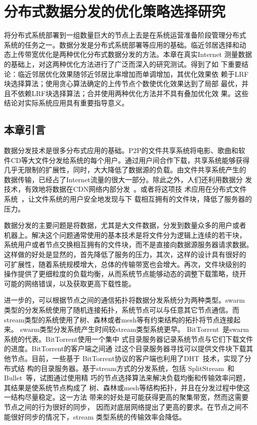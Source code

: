 \chapter{分布式数据分发的优化策略选择研究}
\label{chap:bt}

将分布式系统部署到一组数量巨大的节点上去是在系统运营准备阶段管理分布式
系统的任务之一。数据分发是分布式系统部署等应用的基础。临近邻居选择和动
态上传带宽优化是两种优化分布式数据分发的方法。本章在真实Internet
测量数据的基础上，对这两种优化方法进行了广泛而深入的研究测试。得到了如
下重要结论：临近邻居优化效果随邻近邻居比率增加而单调增加，其优化效果依
赖于LRF块选择算法；使用贪心算法确定的上传节点个数使优化效果达到了局部
最优，并且不依赖LRF块选择算法；合并使用两种优化方法并不具有叠加优化效
果。这些结论对实际系统应用具有重要指导意义。

\section{本章引言}


数据分发技术是很多分布式应用的基础。P2P的文件共享系统将电影、歌曲和软
件CD等大文件分发给系统的每个用户。通过用户间合作下载，共享系统能够获得
几乎无限制的扩展性，同时，大大降低了数据源的负载。由文件共享系统产生的
数据传输，已经占了Internet流量的很大一部分。除此之外，人们还利用数据分
发技术，有效地将数据在CDN网络内部分发~\cite{fastreplica}。或者将这项技
术应用在分布式文件系统~\cite{sharkfs}，让文件系统的用户安全地发现与下
载相互拥有的文件块，降低了服务器的压力。

数据分发的主要问题是将数据，尤其是大文件数据，分发到数量众多的用户或者
机器上。解决这个问题通常使用的基本技术是将文件分为逻辑上连续的若干块，
系统用户或者节点交换相互拥有的文件块，而不是直接向数据源服务器请求数据。
这样做的好处是显然的，首先降低了服务的压力，其次，这样的设计具有很好的
可扩展性，随着系统规模增大，总体的传输带宽也会增大。再次，文件块级别的
操作提供了更细粒度的负载均衡，从而系统节点能够动态的调整下载策略，绕开
可能的网络错误，以及获取更高下载性能。

进一步的，可以根据节点之间的通信拓扑将数据分发系统分为两种类型。swarm
类型的分发系统使用了随机连接拓扑，系统节点可以与任意其它节点通信。而
stream类型的系统使用了树、森林或者mesh等有约束结构的拓扑将节点连接起来。
swarm类型分发系统产生时间较stream类型系统更早。
BitTorrent~\cite{bittorrent}是swarm系统的代表。BitTorrent使用一个集中
式目录服务器记录系统节点与它们下载文件的进度。BitTorrent的客户端之间通
过这个目录服务器寻找可以提供文件块下载其他节点。目前，一些基于
BitTorrent协议的客户端也利用了DHT~\cite{kademlia}技术，实现了分布式结
构的目录服务器。基于stream方式的分发系统，包括
SplitStream~\cite{splitstream}和Bullet~\cite{bullet}等，试图通过使用精
巧的节点选择算法来解决负载均衡和传输效率问题，其结果是使系统节点构成了
树、森林或mesh等结构拓扑，并且在分发过程中使这一结构尽量稳定。这一方法
带来的好处是可能获得更高的聚集带宽，然而这需要节点之间的行为很好的同步，
因而对底层网络提出了更高的要求。在节点之间不能很好同步的情况下，stream
类型系统的传输效率会降低。

